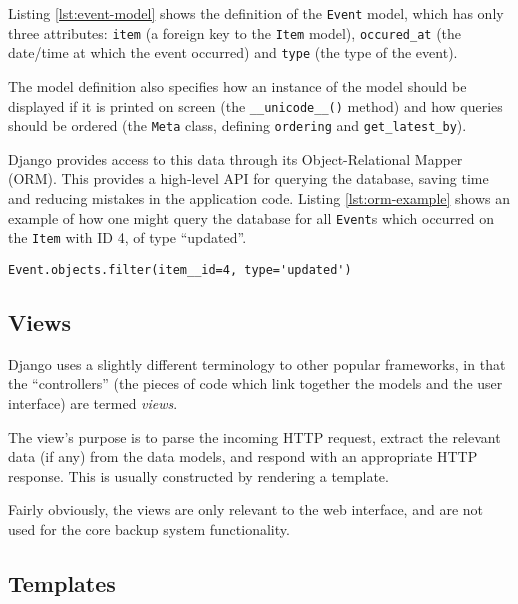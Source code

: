 Listing \ref{lst:event-model} shows the definition of the \verb!Event! model,
which has only three attributes: \verb!item! (a foreign key to the \verb!Item!
model), \verb!occured_at! (the date/time at which the event occurred) and
\verb!type! (the type of the event).

The model definition also specifies how an instance of the model should be
displayed if it is printed on screen (the \verb!__unicode__()! method) and how
queries should be ordered (the \verb!Meta! class, defining \verb!ordering!
and \verb!get_latest_by!).

Django provides access to this data through its Object-Relational Mapper (ORM).
This provides a high-level API for querying the database, saving time and
reducing mistakes in the application code. Listing \ref{lst:orm-example} shows
an example of how one might query the database for all \verb!Event!s which
occurred on the \verb!Item! with ID 4, of type ``updated''.

\begin{singlespacing}
\begin{lstlisting}[caption=Querying for all ``updated'' Events on Item 4,
    label=lst:orm-example]
    Event.objects.filter(item__id=4, type='updated')
\end{lstlisting}
\end{singlespacing}

\subsection{Views}
\label{sec:implementation-django-views}

Django uses a slightly different terminology to other popular frameworks, in
that the ``controllers'' (the pieces of code which link together the models and
the user interface) are termed \emph{views}.

The view's purpose is to parse the incoming HTTP request, extract the relevant
data (if any) from the data models, and respond with an appropriate HTTP
response. This is usually constructed by rendering a template.

Fairly obviously, the views are only relevant to the web interface, and are not
used for the core backup system functionality.

\subsection{Templates}
\label{sec:implementation-django-templates}

